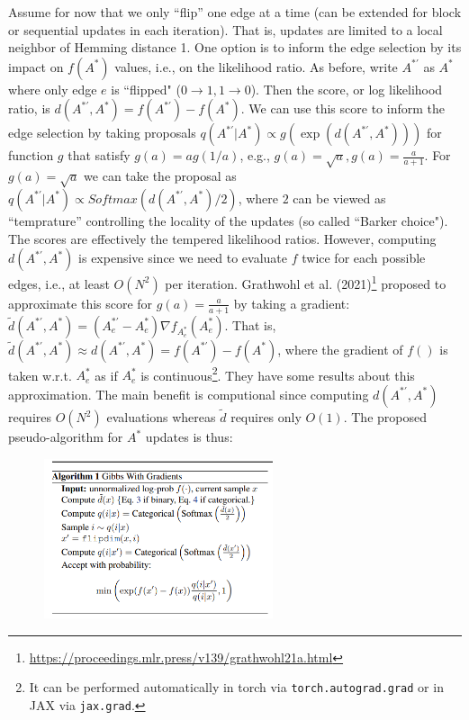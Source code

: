 \documentclass[12pt]{article}
\begin{document}
\begin{enumerate}
            Assume for now that we only ``flip'' one edge at a time 
            (can be extended for block or sequential updates in each iteration). 
            That is, updates are limited to a local neighbor of Hemming distance 1.
            One option is to inform the edge selection by its impact on $f(A^\ast)$ values,
            i.e., on the likelihood ratio.
            As before, write $A^{\ast'}$ as $A^\ast$ where only edge $e$ is ``flipped" ($0\to 1, 1\to 0$).
            Then the score, or log likelihood ratio, is $d(A^{\ast'},A^\ast) = f(A^{\ast'}) - f(A^\ast)$.
            We can use this score to inform the edge selection by taking proposals 
            $q(A^{\ast'} \vert A^\ast) \propto g(\exp(d(A^{\ast'},A^\ast)))$ for function 
            $g$ that satisfy $g(a) = a g(1/a)$, e.g., $g(a)=\sqrt{a}, g(a) = \frac{a}{a+1}$.
            For $g(a) = \sqrt{a}$ we can take the proposal as 
            $q(A^{\ast'} \vert A^\ast) \propto Softmax(d(A^{\ast'},A^\ast)/2)$,
            where $2$ can be viewed as ``temprature'' controlling the locality of the updates
            (so called ``Barker choice").
            The scores are effectively the tempered likelihood ratios.
            However, computing $d(A^{\ast'},A^\ast)$ is expensive since we need to evaluate $f$ twice
            for each possible edges, i.e., at least $O(N^2)$ per iteration. 
            Grathwohl et al. (2021)\footnote{\url{https://proceedings.mlr.press/v139/grathwohl21a.html}}
            proposed to approximate this score for $g(a) = \frac{a}{a+1}$ by taking 
            a gradient:
            $\widetilde{d}(A^{\ast'},A^\ast) = (A^{\ast'}_e - A^{\ast}_e)\nabla f_{A^\ast_e}(A^\ast_e)$.
            That is, $\widetilde{d}(A^{\ast'},A^\ast) \approx d(A^{\ast'},A^\ast) = f(A^{\ast'}) - f(A^\ast)$,
            where the gradient of $f()$ is taken w.r.t. $A^\ast_e$ as if $A^\ast_e$ is 
            continuous\footnote{It can be performed automatically in torch via \texttt{torch.autograd.grad} or in 
            JAX via \texttt{jax.grad}.}.
            They have some results about this approximation.
            The main benefit is computional since computing $d(A^{\ast'},A^\ast)$ requires
            $O(N^2)$ evaluations whereas $\widetilde{d}$ requires only $O(1)$.
            The proposed pseudo-algorithm for $A^\ast$ updates is thus:

            \begin{figure}[!ht]
                \centering
                \includegraphics[width=0.6\textwidth]{gwg.png}
            \end{figure}


\end{enumerate}
\end{document}
